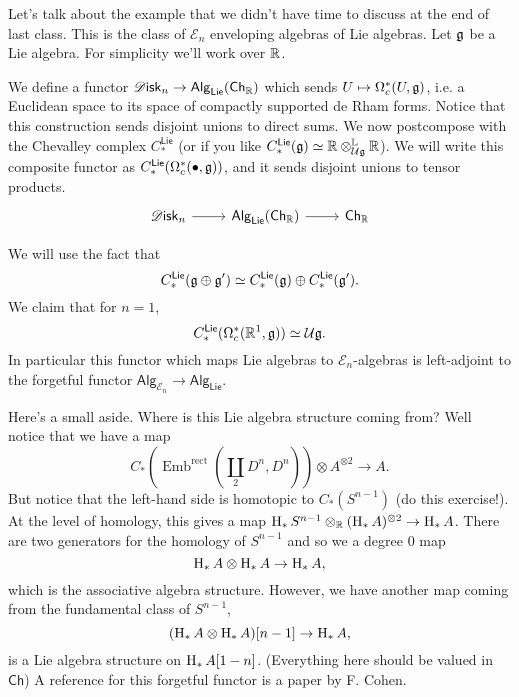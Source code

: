 \documentclass{amsart}
\DeclareMathOperator{\Emb}{Emb}
\newcommand{\Disk}{\mathscr{D}\mathsf{isk}_n}
\begin{document}
Let's talk about the example that we didn't have time to discuss at the end of last class.
This is the class of $\mathcal{E}_n$ enveloping algebras of Lie algebras. Let $\mathfrak g$ be
a Lie algebra. For simplicity we'll work over $\mathbb{R}$. 

We define a functor $\Disk\to \mathsf{Alg}_\mathsf{Lie}(\mathsf{Ch}_\R)$ which sends
$U\mapsto \Omega^*_c(U,\mathfrak g)$, i.e. a Euclidean space to its space of compactly supported
de Rham forms. Notice that this construction sends disjoint unions to direct sums.
We now postcompose with the Chevalley complex $C_*^\mathsf{Lie}$ (or if you like
$C_*^\mathsf{Lie}(\mathfrak g)\simeq \mathbb{R}\otimes_{\mathcal{U}\mathfrak g}^\mathbb{L}\mathbb{R}$).
We will write this composite functor as $C_*^\mathsf{Lie}(\Omega_c^*(\bullet, \mathfrak g))$,
and it sends disjoint unions to tensor products.
\begin{equation*}
    \begin{tikzcd}
        \Disk \rar & \mathsf{Alg}_\mathsf{Lie}(\mathsf{Ch}_\R) \rar & \mathsf{Ch}_\R
    \end{tikzcd}
\end{equation*}

We will use the fact that
\begin{equation*}
    C_*^\mathsf{Lie}(\mathfrak g\oplus \mathfrak g') \simeq C_*^\mathsf{Lie}(\mathfrak g)\oplus C_*^\mathsf{Lie}(\mathfrak g').
\end{equation*}
We claim that for $n=1$,
\begin{equation*}
    C_*^\mathsf{Lie}(\Omega_c^*(\mathbb{R}^1,\mathfrak g)) \simeq \mathcal{U}\mathfrak g.
\end{equation*}
In particular this functor which maps Lie algebras to $\mathcal{E}_n$-algebras is
left-adjoint to the forgetful functor $\mathsf{Alg}_{\mathcal{E}_n}\to \mathsf{Alg}_\mathsf{Lie}$.

Here's a small aside. Where is this Lie algebra structure coming from? Well notice
that we have a map
\begin{equation*}
    C_*(\Emb^\text{rect}(\coprod_2 D^n,D^n))\otimes A^{\otimes 2}\to A.
\end{equation*}
But notice that the left-hand side is homotopic to $C_*(S^{n-1})$ (do this exercise!).
At the level of homology, this gives a map $\operatorname{H}_*S^{n-1}\otimes_{\mathbb{R}} (\operatorname{H}_*A)^{\otimes 2}\to \operatorname{H}_*A$.
There are two generators for the homology of $S^{n-1}$ and so we a degree 0 map
\begin{equation*}
    \operatorname{H}_*A\otimes\operatorname{H}_*A \to \operatorname{H}_*A,
\end{equation*}
which is the associative algebra structure. However, we have another map coming from
the fundamental class of $S^{n-1}$,
\begin{equation*}
    (\operatorname{H}_*A \otimes \operatorname{H}_*A)[n-1] \to \operatorname{H}_*A,
\end{equation*}
is a Lie algebra structure on $\operatorname{H}_*A[1-n]$. (Everything here should be valued in $\mathsf{Ch}$)
A reference for this forgetful functor is a paper by F. Cohen.
\end{document}

